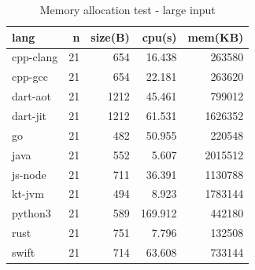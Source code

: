 \begin{table}[ht]
    \caption{Memory allocation test - large input}
    \label{tab:binary-trees-1}
    \begin{center}
        \begin{tabular}{lrrrr}
            \toprule
            lang      & n  & size(B) & cpu(s)  & mem(KB) \\
            \midrule
            cpp-clang & 21 & 654     & 16.438  & 263580  \\
            cpp-gcc   & 21 & 654     & 22.181  & 263620  \\
            dart-aot  & 21 & 1212    & 45.461  & 799012  \\
            dart-jit  & 21 & 1212    & 61.531  & 1626352 \\
            go        & 21 & 482     & 50.955  & 220548  \\
            java      & 21 & 552     & 5.607   & 2015512 \\
            js-node   & 21 & 711     & 36.391  & 1130788 \\
            kt-jvm    & 21 & 494     & 8.923   & 1783144 \\
            python3   & 21 & 589     & 169.912 & 442180  \\
            rust      & 21 & 751     & 7.796   & 132508  \\
            swift     & 21 & 714     & 63.608  & 733144  \\
            \bottomrule
        \end{tabular}
    \end{center}
\end{table}

